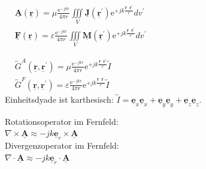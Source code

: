 \documentclass[english]{latex4ei/latex4ei_sheet}
\renewcommand{\vec}[1]{\underline{\boldsymbol{#1}}}
\begin{document}
\begin{sectionbox}
	\begin{emphbox}
		$\begin{aligned}
			&\vec{A}(\vec{r})=\mu \frac{\mathrm{e}^{-j k r}}{4 \pi r} \iiint\limits_{V} \vec{J}\left(\vec{r}^{\prime}\right) \mathrm{e}^{+j k \frac{\vec{r}\cdot \vec{r}^{\prime}}{r} } d v^{\prime} \\
			&\vec{F}(\vec{r})=\varepsilon \frac{\mathrm{e}^{-j k r}}{4 \pi r} \iiint\limits_{V} \vec{M}\left(\vec{r}^{\prime}\right) \mathrm{e}^{+j k \frac{\vec{r}\cdot \vec{r}^{\prime} }{r}} d v^{\prime}
			\end{aligned}$
	\end{emphbox}
	\begin{emphbox}
		$\begin{aligned}
			&\overleftrightarrow{G}^A(\vec{r}, \vec{r}^\prime)=\mu \frac{\mathrm{e}^{-j k r}}{4 \pi r} \mathrm{e}^{+j k \frac{\vec{r}\cdot \vec{r}^{\prime}}{r} } \overleftrightarrow{I} \\
			&\overleftrightarrow{G}^F(\vec{r}, \vec{r}^\prime)=\varepsilon \frac{\mathrm{e}^{-j k r}}{4 \pi r} \mathrm{e}^{+j k \frac{\vec{r}\cdot \vec{r}^{\prime}}{r} } \overleftrightarrow{I}
			\end{aligned}$\\
			\vspace{1em}
			Einheitsdyade ist karthesisch: $\overleftrightarrow{I} = \vec{e}_x\vec{e}_x + \vec{e}_y\vec{e}_y + \vec{e}_z\vec{e}_z$.
	\end{emphbox}
	\begin{emphbox}
		Rotationsoperator im Fernfeld:\\
		$\nabla \times \vec{A} \approx -jk \vec{e}_r \times \vec{A}$\\
		Divergenzoperator im Fernfeld:\\
		$\nabla \cdot \vec{A} \approx -jk \vec{e}_r \cdot \vec{A}$\\
	\end{emphbox}
\end{sectionbox}
\end{document}
